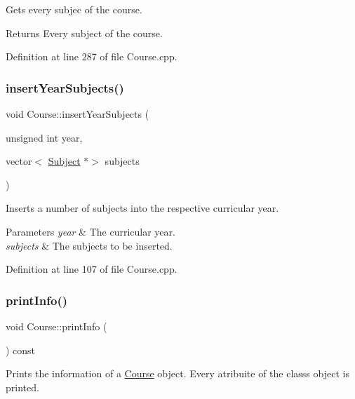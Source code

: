 Gets every subjec of the course. \begin{DoxyReturn}{Returns}
Every subject of the course. 
\end{DoxyReturn}


Definition at line 287 of file Course.\+cpp.

\mbox{\label{classCourse_ac0ce13dcddfd17ccbd9606d0033aa713}} 
\subsubsection{\texorpdfstring{insert\+Year\+Subjects()}{insertYearSubjects()}}
{\footnotesize\ttfamily void Course\+::insert\+Year\+Subjects (\begin{DoxyParamCaption}\item[{unsigned int}]{year,  }\item[{vector$<$ \hyperlink{classSubject}{Subject} $\ast$$>$}]{subjects }\end{DoxyParamCaption})}

Inserts a number of subjects into the respective curricular year. 
\begin{DoxyParams}{Parameters}
{\em year} & The curricular year. \\
\hline
{\em subjects} & The subjects to be inserted. \\
\hline
\end{DoxyParams}


Definition at line 107 of file Course.\+cpp.

\mbox{\label{classCourse_a3248ecd5df196cf50ce379ec37758c59}} 
\subsubsection{\texorpdfstring{print\+Info()}{printInfo()}}
{\footnotesize\ttfamily void Course\+::print\+Info (\begin{DoxyParamCaption}{ }\end{DoxyParamCaption}) const\hspace{0.3cm}{\ttfamily [virtual]}}

Prints the information of a \hyperlink{classCourse}{Course} object. Every atribuite of the class\textquotesingle{}s object is printed. 

